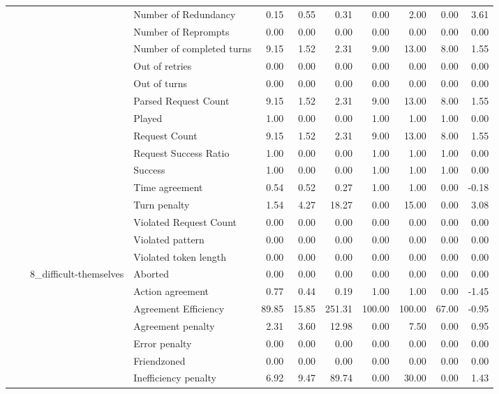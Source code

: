 \begin{tabular}{llllrrrrrrr}
 &  &  & Number of Redundancy & 0.15 & 0.55 & 0.31 & 0.00 & 2.00 & 0.00 & 3.61 \\
 &  &  & Number of Reprompts & 0.00 & 0.00 & 0.00 & 0.00 & 0.00 & 0.00 & 0.00 \\
 &  &  & Number of completed turns & 9.15 & 1.52 & 2.31 & 9.00 & 13.00 & 8.00 & 1.55 \\
 &  &  & Out of retries & 0.00 & 0.00 & 0.00 & 0.00 & 0.00 & 0.00 & 0.00 \\
 &  &  & Out of turns & 0.00 & 0.00 & 0.00 & 0.00 & 0.00 & 0.00 & 0.00 \\
 &  &  & Parsed Request Count & 9.15 & 1.52 & 2.31 & 9.00 & 13.00 & 8.00 & 1.55 \\
 &  &  & Played & 1.00 & 0.00 & 0.00 & 1.00 & 1.00 & 1.00 & 0.00 \\
 &  &  & Request Count & 9.15 & 1.52 & 2.31 & 9.00 & 13.00 & 8.00 & 1.55 \\
 &  &  & Request Success Ratio & 1.00 & 0.00 & 0.00 & 1.00 & 1.00 & 1.00 & 0.00 \\
 &  &  & Success & 1.00 & 0.00 & 0.00 & 1.00 & 1.00 & 1.00 & 0.00 \\
 &  &  & Time agreement & 0.54 & 0.52 & 0.27 & 1.00 & 1.00 & 0.00 & -0.18 \\
 &  &  & Turn penalty & 1.54 & 4.27 & 18.27 & 0.00 & 15.00 & 0.00 & 3.08 \\
 &  &  & Violated Request Count & 0.00 & 0.00 & 0.00 & 0.00 & 0.00 & 0.00 & 0.00 \\
 &  &  & Violated pattern & 0.00 & 0.00 & 0.00 & 0.00 & 0.00 & 0.00 & 0.00 \\
 &  &  & Violated token length & 0.00 & 0.00 & 0.00 & 0.00 & 0.00 & 0.00 & 0.00 \\
\cline{3-11}
 &  & \multirow[t]{27}{*}{8_difficult-themselves} & Aborted & 0.00 & 0.00 & 0.00 & 0.00 & 0.00 & 0.00 & 0.00 \\
 &  &  & Action agreement & 0.77 & 0.44 & 0.19 & 1.00 & 1.00 & 0.00 & -1.45 \\
 &  &  & Agreement Efficiency & 89.85 & 15.85 & 251.31 & 100.00 & 100.00 & 67.00 & -0.95 \\
 &  &  & Agreement penalty & 2.31 & 3.60 & 12.98 & 0.00 & 7.50 & 0.00 & 0.95 \\
 &  &  & Error penalty & 0.00 & 0.00 & 0.00 & 0.00 & 0.00 & 0.00 & 0.00 \\
 &  &  & Friendzoned & 0.00 & 0.00 & 0.00 & 0.00 & 0.00 & 0.00 & 0.00 \\
 &  &  & Inefficiency penalty & 6.92 & 9.47 & 89.74 & 0.00 & 30.00 & 0.00 & 1.43 \\

\end{tabular}
